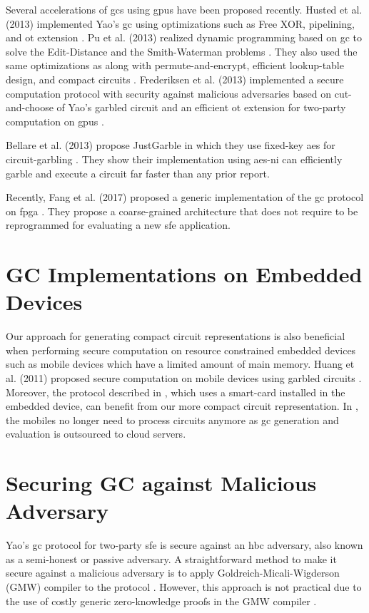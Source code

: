 Several accelerations of \acrshort{gc}s using \acrshort{gpu}s have been proposed recently.
Husted et al. (2013) implemented Yao's \acrshort{gc} using optimizations such as Free XOR, pipelining, and \acrshort{ot} extension \cite{husted2013gpu}.
Pu et al. (2013) realized dynamic programming based on \acrshort{gc} to solve the Edit-Distance and the Smith-Waterman problems \cite{pu2013computing}.
They also used the same optimizations as \cite{husted2013gpu} along with permute-and-encrypt, efficient lookup-table design, and compact circuits \cite{pu2013computing}.
Frederiksen et al. (2013) implemented a secure computation protocol with security against malicious adversaries based on cut-and-choose of Yao's garbled circuit and an efficient \acrshort{ot} extension for two-party computation on \acrshort{gpu}s \cite{frederiksen2013fast}.

Bellare et al. (2013) propose JustGarble in which they use fixed-key \acrshort{aes} for circuit-garbling \cite{bellare2013efficient}.
They show their implementation using \acrshort{aes-ni} can efficiently garble and execute a circuit far faster than any prior report.

Recently, Fang et al. (2017) proposed a generic implementation of the \acrshort{gc} protocol on \acrshort{fpga} \cite{fang2017secure}.
They propose a coarse-grained architecture that does not require to be reprogrammed for evaluating a new \acrshort{sfe} application.

\section{GC Implementations on Embedded Devices} \label{sec:related-embedded}
Our approach for generating compact circuit representations is also beneficial when performing secure computation on resource constrained embedded devices such as mobile devices which have a limited amount of main memory.
Huang et al. (2011) proposed secure computation on mobile devices using garbled circuits \cite{huang2011privacy}.
Moreover, the protocol described in \cite{demmler2014ad}, which uses a smart-card installed in the embedded device, can benefit from our more compact circuit representation.
In \cite{carter2016secure, carter2014whitewash}, the mobiles no longer need to process circuits anymore as \acrshort{gc} generation and evaluation is outsourced to cloud servers.

\section{Securing GC against Malicious Adversary}\label{sec:related-malicious}
Yao's \acrshort{gc} protocol for two-party \acrshort{sfe} is secure against an \acrfull{hbc} adversary, also known as a semi-honest or passive adversary.
A straightforward method to make it secure against a malicious adversary is to apply Goldreich-Micali-Wigderson (GMW) compiler to the protocol \cite{goldreich1987play}.
However, this approach is not practical due to the use of costly generic zero-knowledge proofs in the GMW compiler \cite{lindell2007efficient}.

